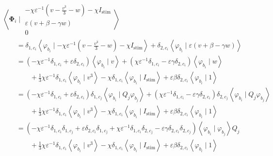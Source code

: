 \documentclass{article}
\newcommand{\bvec}[1]{\boldsymbol{#1}}
\begin{document}
\begin{align*}
    & \left< \bvec{\Phi}_i \mid \begin{matrix}
            -\chi \varepsilon^{-1} (v - \frac{v^3}{3} - w)
                - \chi I_\text{stim} \\
            \varepsilon (v + \beta - \gamma w) \\
            0
        \end{matrix} \right> \\
    & \qquad = \delta_{1, c_i} \left< \varphi_{b_i} \mid -\chi \varepsilon^{-1} (v - \frac{v^3}{3} - w)
        - \chi I_\text{stim} \right>
        + \delta_{2, c_i} \left< \varphi_{b_i} \mid \varepsilon (v + \beta - \gamma w) \right> \\
    & \qquad = (-\chi \varepsilon^{-1} \delta_{1, c_i} + \varepsilon \delta_{2, c_i})
            \left< \varphi_{b_i} \mid v \right>
        + (\chi \varepsilon^{-1} \delta_{1, c_i} - \varepsilon \gamma \delta_{2, c_i})
            \left< \varphi_{b_i} \mid w \right> \\
        & \qquad \qquad + \frac{1}{3} \chi \varepsilon^{-1} \delta_{1, c_i}
            \left< \varphi_{b_i} \mid v^3 \right>
        - \chi \delta_{1, c_i} \left< \varphi_{b_i} \mid I_\text{stim} \right>
        + \varepsilon \beta \delta_{2, c_i} \left< \varphi_{b_i} \mid 1 \right> \\
    & \qquad = (-\chi \varepsilon^{-1} \delta_{1, c_i} + \varepsilon \delta_{2, c_i}) \delta_{1, c_j}
            \left< \varphi_{b_i} \mid Q_j \varphi_{b_j} \right>
        + (\chi \varepsilon^{-1} \delta_{1, c_i} - \varepsilon \gamma \delta_{2, c_i}) \delta_{2, c_j}
            \left< \varphi_{b_i} \mid Q_j \varphi_{b_j} \right> \\
        & \qquad \qquad + \frac{1}{3} \chi \varepsilon^{-1} \delta_{1, c_i}
            \left< \varphi_{b_i} \mid v^3 \right>
        - \chi \delta_{1, c_i} \left< \varphi_{b_i} \mid I_\text{stim} \right>
        + \varepsilon \beta \delta_{2, c_i} \left< \varphi_{b_i} \mid 1 \right> \\
    & \qquad = (-\chi \varepsilon^{-1} \delta_{1, c_i} \delta_{1, c_j} + \varepsilon \delta_{2, c_i} \delta_{1, c_j}
                + \chi \varepsilon^{-1} \delta_{1, c_i} \delta_{2, c_j} - \varepsilon \gamma \delta_{2, c_i} \delta_{2, c_j})
            \left< \varphi_{b_i} \mid \varphi_{b_j} \right> Q_j \\
        & \qquad \qquad + \frac{1}{3} \chi \varepsilon^{-1} \delta_{1, c_i}
            \left< \varphi_{b_i} \mid v^3 \right>
        - \chi \delta_{1, c_i} \left< \varphi_{b_i} \mid I_\text{stim} \right>
        + \varepsilon \beta \delta_{2, c_i} \left< \varphi_{b_i} \mid 1 \right>
\end{align*}
\end{document}
